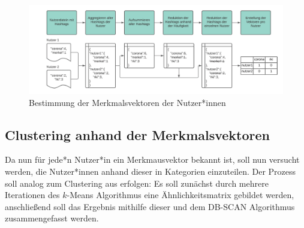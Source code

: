 \begin{figure}[h]
	\centering
	\includegraphics[width=\linewidth]{images/vergehen_merkmalsvektoren_nutzer}
	\caption[]{Bestimmung der Merkmalsvektoren der Nutzer*innen}
	\label{fig:merkmalsvektoren}
\end{figure}
\subsection{Clustering anhand der Merkmalsvektoren}
Da nun für jede*n Nutzer*in ein Merkmausvektor bekannt ist, soll nun versucht werden, die Nutzer*innen anhand dieser in Kategorien einzuteilen. Der Prozess soll analog zum Clustering aus \cite{Godfrey.21.08.2014} erfolgen: Es soll zunächst durch mehrere Iterationen des $k$-Means Algorithmus eine Ähnlichkeitsmatrix gebildet werden, anschließend soll das Ergebnis mithilfe dieser und dem DB-SCAN Algorithmus zusammengefasst werden. 
